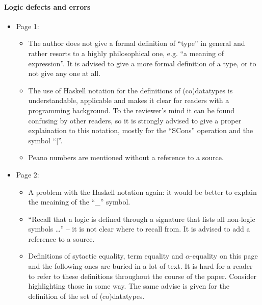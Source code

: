 \paragraph{Logic defects and errors}
\begin{itemize}
	\item Page 1:
	\begin{itemize}
		\item The author does not give a formal definition of ``type'' in general and rather resorts to a highly philosophical one, e.g. ``a meaning of expression''. It is advised to give a more formal definition of a type, or to not give any one at all.
		\item The use of Haskell notation for the definitions of (co)datatypes is understandable, applicable and makes it clear for readers with a programming background. To the reviewer's mind it can be found confusing by other readers, so it is strongly advised to give a proper explaination to this notation, mostly for the ``SCons'' operation and the symbol ``$|$''.
		\item Peano numbers are mentioned without a reference to a source.
	\end{itemize} 

	\item Page 2:
	\begin{itemize}
		\item A problem with the Haskell notation again: it would be better to explain the meaining of the ``\_'' symbol.
		\item ``Recall that a logic is defined through a signature that lists all non-logic symbols \dots'' -- it is not clear where to recall from. It is advised to add a reference to a source.
		\item Definitions of sytactic equality, term equality and $\alpha$-equality on this page and the following ones are buried in a lot of text. It is hard for a reader to refer to these definitions throughout the course of the paper. Consider highlighting those in some way. The same advise is given for the definition of the set of (co)datatypes.
	\end{itemize}


\end{itemize}
